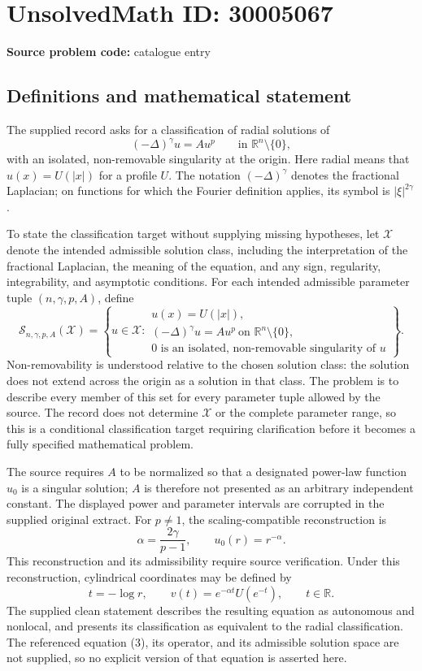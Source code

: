 \documentclass[11pt]{article}
\newcommand{\R}{\mathbb{R}}
\begin{document}
\section*{UnsolvedMath ID: 30005067}
\textbf{Source problem code:} catalogue entry
\subsection{Definitions and mathematical statement}
The supplied record asks for a classification of radial solutions of
\[
(-\Delta)^\gamma u=A u^p\qquad\text{in }\R^n\setminus\{0\},
\]
with an isolated, non-removable singularity at the origin. Here radial means that \(u(x)=U(|x|)\) for a profile \(U\). The notation \(( -\Delta)^\gamma\) denotes the fractional Laplacian; on functions for which the Fourier definition applies, its symbol is \(|\xi|^{2\gamma}\).

To state the classification target without supplying missing hypotheses, let \(\mathcal X\) denote the intended admissible solution class, including the interpretation of the fractional Laplacian, the meaning of the equation, and any sign, regularity, integrability, and asymptotic conditions. For each intended admissible parameter tuple \((n,\gamma,p,A)\), define
\[
\mathcal S_{n,\gamma,p,A}(\mathcal X)
=\left\{u\in\mathcal X:\begin{array}{l}
u(x)=U(|x|),\\
(-\Delta)^\gamma u=A u^p\ \text{on }\R^n\setminus\{0\},\\
0\text{ is an isolated, non-removable singularity of }u
\end{array}\right\}.
\]
Non-removability is understood relative to the chosen solution class: the solution does not extend across the origin as a solution in that class. The problem is to describe every member of this set for every parameter tuple allowed by the source. The record does not determine \(\mathcal X\) or the complete parameter range, so this is a conditional classification target requiring clarification before it becomes a fully specified mathematical problem.

The source requires \(A\) to be normalized so that a designated power-law function \(u_0\) is a singular solution; \(A\) is therefore not presented as an arbitrary independent constant. The displayed power and parameter intervals are corrupted in the supplied original extract. For \(p\ne1\), the scaling-compatible reconstruction is
\[
\alpha=\frac{2\gamma}{p-1},\qquad u_0(r)=r^{-\alpha}.
\]
This reconstruction and its admissibility require source verification. Under this reconstruction, cylindrical coordinates may be defined by
\[
t=-\log r,\qquad v(t)=e^{-\alpha t}U(e^{-t}),\qquad t\in\R.
\]
The supplied clean statement describes the resulting equation as autonomous and nonlocal, and presents its classification as equivalent to the radial classification. The referenced equation (3), its operator, and its admissible solution space are not supplied, so no explicit version of that equation is asserted here.
\end{document}
